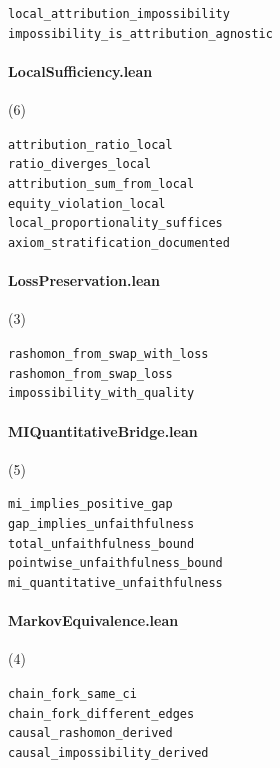 {\footnotesize
\texttt{local\_attribution\_impossibility}\\
\texttt{impossibility\_is\_attribution\_agnostic}\\
}

\paragraph{LocalSufficiency.lean} (6)

{\footnotesize
\texttt{attribution\_ratio\_local}\\
\texttt{ratio\_diverges\_local}\\
\texttt{attribution\_sum\_from\_local}\\
\texttt{equity\_violation\_local}\\
\texttt{local\_proportionality\_suffices}\\
\texttt{axiom\_stratification\_documented}\\
}

\paragraph{LossPreservation.lean} (3)

{\footnotesize
\texttt{rashomon\_from\_swap\_with\_loss}\\
\texttt{rashomon\_from\_swap\_loss}\\
\texttt{impossibility\_with\_quality}\\
}

\paragraph{MIQuantitativeBridge.lean} (5)

{\footnotesize
\texttt{mi\_implies\_positive\_gap}\\
\texttt{gap\_implies\_unfaithfulness}\\
\texttt{total\_unfaithfulness\_bound}\\
\texttt{pointwise\_unfaithfulness\_bound}\\
\texttt{mi\_quantitative\_unfaithfulness}\\
}

\paragraph{MarkovEquivalence.lean} (4)

{\footnotesize
\texttt{chain\_fork\_same\_ci}\\
\texttt{chain\_fork\_different\_edges}\\
\texttt{causal\_rashomon\_derived}\\
\texttt{causal\_impossibility\_derived}\\
}

